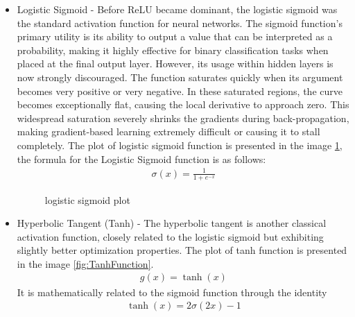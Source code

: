 \begin{itemize}
	\item Logistic Sigmoid - Before ReLU became dominant, the logistic sigmoid was the standard activation function for neural networks. The sigmoid function's primary utility is its ability to output a value that can be interpreted as a probability, making it highly effective for binary classification tasks when placed at the final output layer. However, its usage within hidden layers is now strongly discouraged. The function saturates quickly when its argument becomes very positive or very negative. In these saturated regions, the curve becomes exceptionally flat, causing the local derivative to approach zero. This widespread saturation severely shrinks the gradients during back-propagation, making gradient-based learning extremely difficult or causing it to stall completely. The plot of logistic sigmoid function is presented in the image \ref{fig:SigmoidFunction}, the formula for the Logistic Sigmoid function is as follows:
	\begin{align}
		\sigma(x) = \frac{1}{1 + e^{-x}}
	\end{align}
	\begin{figure} [H]
		\centering
		\caption{logistic sigmoid plot}
		\label{fig:SigmoidFunction}
	\end{figure}
	
	\item Hyperbolic Tangent (Tanh) - The hyperbolic tangent is another classical activation function, closely related to the logistic sigmoid but exhibiting slightly better optimization properties. The plot of tanh function is presented in the image \ref{fig:TanhFunction}.
	\begin{align}
		g(x) = \tanh(x)
	\end{align}
	It is mathematically related to the sigmoid function through the identity
	\begin{align}
		\tanh(x) = 2 \sigma(2x) - 1
	\end{align}
	

\end{itemize}
